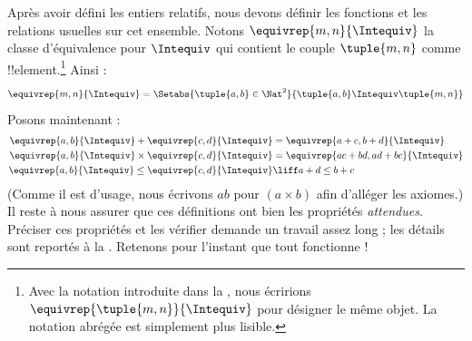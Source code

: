 \documentclass[11pt,a4paper,openany]{memoir}
\begin{document}
Après avoir défini les entiers relatifs, nous devons définir les fonctions et les relations usuelles sur cet ensemble. Notons $\equivrep{m, n}{\Intequiv}$ la classe d'équivalence pour $\Intequiv$ qui contient le couple $\tuple{m, n}$ comme !!{element}.\footnote{Avec la notation introduite dans la , nous écririons $\equivrep{\tuple{m,n}}{\Intequiv}$ pour désigner le même objet. La notation abrégée est simplement plus lisible.} Ainsi :
	$$\equivrep{m, n}{\Intequiv} = \Setabs{\tuple{a, b} \in \Nat^2}{\tuple{a, b}\Intequiv \tuple{m, n}}$$
Posons maintenant :
	\begin{align*}
		\equivrep{a, b}{\Intequiv} + \equivrep{c, d}{\Intequiv} &= \equivrep{a + c, b + d}{\Intequiv}\\
		\equivrep{a, b}{\Intequiv} \times \equivrep{c, d}{\Intequiv} &= \equivrep{a c + b  d, a  d + b c}{\Intequiv}\\
		\equivrep{a, b}{\Intequiv} \leq \equivrep{c, d}{\Intequiv} &\liff a + d \leq b + c
	\end{align*}
(Comme il est d'usage, nous écrivons $ab$ pour $(a \times b)$ afin d'alléger les axiomes.) Il reste à nous assurer que ces définitions ont bien les propriétés \emph{attendues}. Préciser ces propriétés et les vérifier demande un travail assez long ; les détails sont reportés à la . Retenons pour l'instant que tout fonctionne !{}
\end{document}

